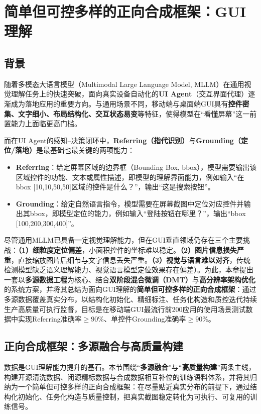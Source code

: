 \chapter{简单但可控多样的正向合成框架：GUI理解}
\label{chap:gui}

\section{背景}
随着多模态大语言模型（Multimodal Large Language Model, MLLM）在通用视觉理解任务上的快速突破，面向真实设备自动化的\textbf{UI Agent}（交互界面代理）逐渐成为落地应用的重要方向。与通用场景不同，移动端与桌面端GUI具有\textbf{控件密集、文字细小、布局结构化、交互状态易变}等特征，使得模型在“看懂屏幕”这一前置能力上面临更高门槛。

而在UI Agent的感知--决策闭环中，\textbf{Referring（指代识别）}与\textbf{Grounding（定位/落地）}是最基础也最关键的两项能力：
\begin{itemize}
  \item \textbf{Referring}：给定屏幕区域的边界框（Bounding Box, bbox），模型需要输出该区域控件的功能、文本或属性描述，即模型的理解界面能力，例如输入“在bbox [10,10,50,50]区域的控件是什么？”，输出“这是搜索按钮”。
  \item \textbf{Grounding}：给定自然语言指令，模型需要在屏幕截图中定位对应控件并输出其bbox，即模型定位的能力，例如输入“登陆按钮在哪里？”，输出“bbox [100,200,300,400]”。
\end{itemize}

尽管通用MLLM已具备一定视觉理解能力，但在GUI垂直领域仍存在三个主要挑战：\textbf{（1）细粒度定位偏差}，小面积控件的坐标难以稳定。\textbf{（2）图片信息损失严重}，直接缩放图片后细节与文字信息丢失严重。\textbf{（3）视觉与语言难以对齐}，传统检测模型缺乏语义理解能力、视觉语言模型定位效果存在偏差）。为此，本章提出一套以\textbf{多源数据工程}为核心、结合\textbf{双阶段混合微调（DMT）}与\textbf{高分辨率架构优化}的系统方案，并将其总结为面向GUI理解的\textbf{简单但可控多样的正向合成框架}：通过多源数据覆盖真实分布，以结构化初始化、精细标注、任务化构造和质控迭代持续生产高质量可执行监督，目标是在移动端GUI最流行前200应用的使用场景测试数据中实现Referring准确率$\ge 90\%$、单控件Grounding准确率$\ge 90\%$。

\section{正向合成框架：多源融合与高质量构建}
数据是GUI理解能力提升的基石。本节围绕“\textbf{多源融合}”与“\textbf{高质量构建}”两条主线，构建开源清洗数据、闭源精标数据与合成数据相互补位的训练语料体系，并将其归纳为一个简单但可控多样的正向合成框架：在尽量贴近真实分布的前提下，通过结构化初始化、任务化构造与质量控制，把真实截图稳定转化为可执行、可复用的训练信号。

